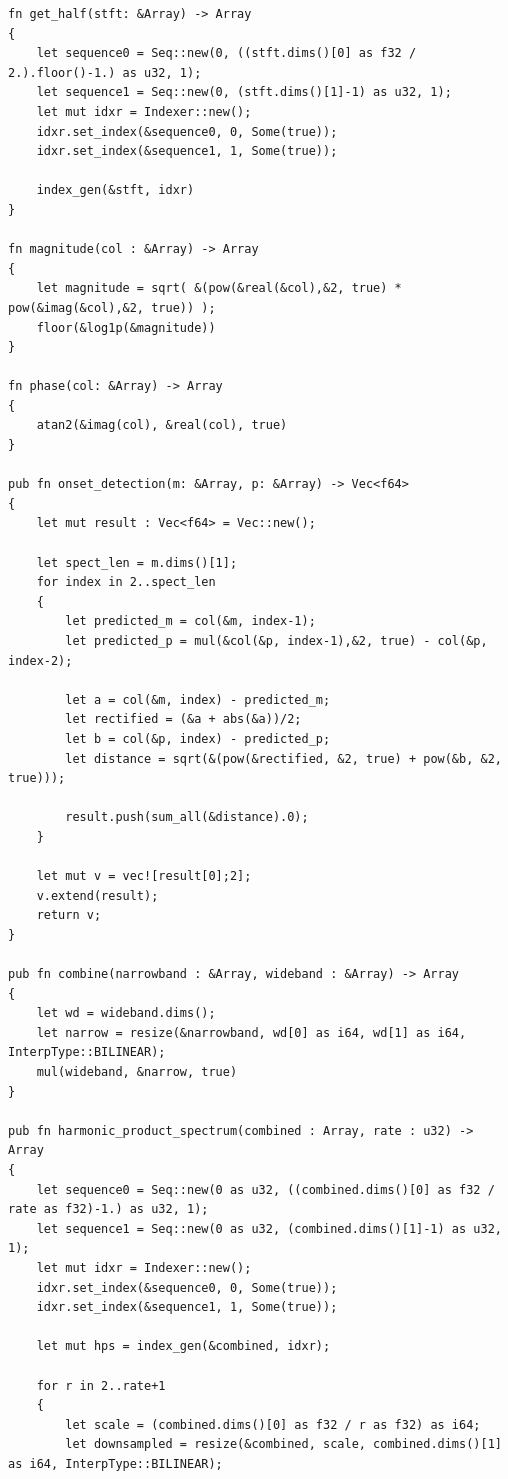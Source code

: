 \documentclass[a4paper,12pt]{report}
\begin{document}
\begin{verbatim}
fn get_half(stft: &Array) -> Array
{
    let sequence0 = Seq::new(0, ((stft.dims()[0] as f32 / 2.).floor()-1.) as u32, 1);
    let sequence1 = Seq::new(0, (stft.dims()[1]-1) as u32, 1);    
    let mut idxr = Indexer::new();            
    idxr.set_index(&sequence0, 0, Some(true));
    idxr.set_index(&sequence1, 1, Some(true));    
    
    index_gen(&stft, idxr)
}

fn magnitude(col : &Array) -> Array
{
    let magnitude = sqrt( &(pow(&real(&col),&2, true) * pow(&imag(&col),&2, true)) );
    floor(&log1p(&magnitude))
}

fn phase(col: &Array) -> Array
{
    atan2(&imag(col), &real(col), true)
}

pub fn onset_detection(m: &Array, p: &Array) -> Vec<f64>
{
    let mut result : Vec<f64> = Vec::new();

    let spect_len = m.dims()[1];
    for index in 2..spect_len
    {
        let predicted_m = col(&m, index-1);
        let predicted_p = mul(&col(&p, index-1),&2, true) - col(&p, index-2);

        let a = col(&m, index) - predicted_m;
        let rectified = (&a + abs(&a))/2;
        let b = col(&p, index) - predicted_p;
        let distance = sqrt(&(pow(&rectified, &2, true) + pow(&b, &2, true))); 

        result.push(sum_all(&distance).0);
    }

    let mut v = vec![result[0];2];
    v.extend(result);
    return v;
}

pub fn combine(narrowband : &Array, wideband : &Array) -> Array
{
    let wd = wideband.dims();
    let narrow = resize(&narrowband, wd[0] as i64, wd[1] as i64, InterpType::BILINEAR);
    mul(wideband, &narrow, true)
}

pub fn harmonic_product_spectrum(combined : Array, rate : u32) -> Array
{
    let sequence0 = Seq::new(0 as u32, ((combined.dims()[0] as f32 / rate as f32)-1.) as u32, 1);
    let sequence1 = Seq::new(0 as u32, (combined.dims()[1]-1) as u32, 1);
    let mut idxr = Indexer::new();            
    idxr.set_index(&sequence0, 0, Some(true));
    idxr.set_index(&sequence1, 1, Some(true));    
  
    let mut hps = index_gen(&combined, idxr);

    for r in 2..rate+1
    {
        let scale = (combined.dims()[0] as f32 / r as f32) as i64;
        let downsampled = resize(&combined, scale, combined.dims()[1] as i64, InterpType::BILINEAR);


\end{verbatim}
\end{document}
